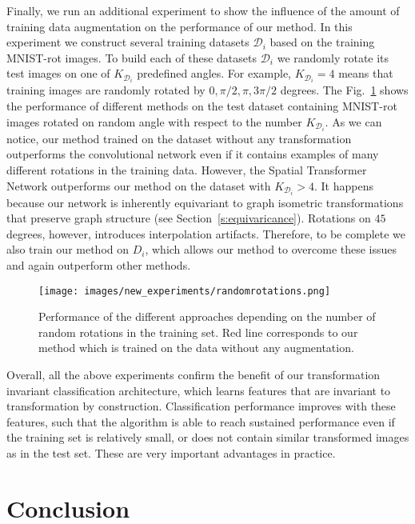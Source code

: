 \documentclass[10pt,journal,compsoc]{IEEEtran}
\begin{document}
	Finally, we run an additional experiment to show the influence of the amount of training data augmentation on the performance of our method. In this experiment we construct several training datasets $\mathcal{D}_i$ based on the training MNIST-rot images. To build each of these datasets $\mathcal{D}_i$ we randomly rotate its test images on one of $K_{\mathcal{D}_i}$ predefined angles. For example, $K_{\mathcal{D}_i}=4$ means that training images are randomly rotated by $0, \pi/2, \pi, 3\pi/2$ degrees. The Fig.~\ref{fig:randomrot} shows the performance of different methods on the test dataset containing MNIST-rot images rotated on random angle with respect to the number $K_{\mathcal{D}_i}$. As we can notice, our method trained on the dataset without any transformation outperforms the convolutional network even if it contains examples of many different rotations in the training data. However, the Spatial Transformer Network outperforms our method on the dataset with $K_{\mathcal{D}_i} > 4$. It happens because our network is inherently equivariant to graph isometric transformations that preserve graph structure (see Section~\ref{s:equivaricance}). Rotations on $45$ degrees, however, introduces interpolation artifacts.
	Therefore, to be complete we also train our method on $D_i$, which allows our method to overcome these issues and again outperform other methods.

	\begin{figure}[t!]
		\texttt{[image: images/new\_experiments/randomrotations.png]}
		\caption{Performance of the different approaches depending on the number of random rotations in the training set. Red line corresponds to our method which is trained on the data without any augmentation.}
		\label{fig:randomrot}
	\end{figure}


	Overall, all the above experiments confirm the benefit of our transformation invariant classification architecture, which learns features that are invariant to transformation by construction. Classification performance improves with these features, such that the algorithm is able to reach sustained performance even if the training set is relatively small, or does not contain similar transformed images as in the test set. These are very important advantages in practice.


	\section{Conclusion}
	\label{s:conclusion}
\end{document}
